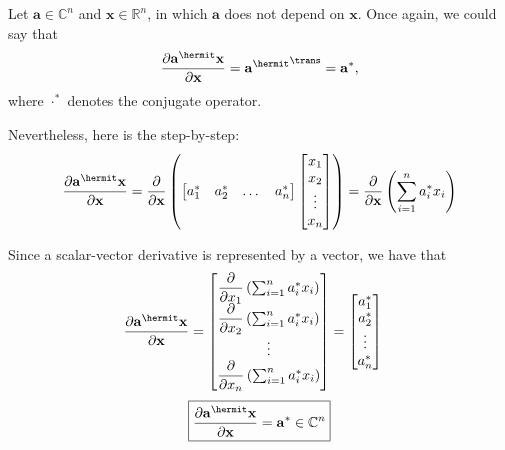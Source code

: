Let \(\mathbf{a} \in \mathbb{C}^{n}\) and \(\mathbf{x}\in \mathbb{R}^{n}\), in which \(\mathbf{a}\) does not depend on \(\mathbf{x}\). Once again, we could say that
\begin{align}
    \dfrac{\partial \mathbf{a}^\hermit \mathbf{x}}{\partial \mathbf{x}} = {\mathbf{a}^\hermit}^\trans = \mathbf{a}^*,
\end{align}
where \(\cdot^*\) denotes the conjugate operator.

Nevertheless, here is the step-by-step:
\begin{align}
    \dfrac{\partial \mathbf{a}^\hermit \mathbf{x}}{\partial \mathbf{x}} &= \dfrac{\partial}{\partial \mathbf{x}} \left(
    \begin{bmatrix}
        a^*_1 & a^*_2 & \dots & a^*_n
    \end{bmatrix} \begin{bmatrix}
        x_{1} \\ x_{2} \\ \vdots \\ x_{n}
    \end{bmatrix} \right) 
    = \dfrac{\partial}{\partial \mathbf{x}} \left( \sum_{i = 1}^n a^*_ix_i \right) \\
\end{align}

Since a scalar-vector derivative is represented by a vector, we have that
\begin{align}
    \dfrac{\partial \mathbf{a}^\hermit \mathbf{x}}{\partial \mathbf{x}} &= \begin{bmatrix}
        \dfrac{\partial}{\partial x_1} \left( \sum_{i = 1}^n a^*_ix_i \right) \\ \dfrac{\partial}{\partial x_2} \left( \sum_{i = 1}^n a^*_ix_i \right) \\ \vdots \\ \dfrac{\partial}{\partial x_n} \left( \sum_{i = 1}^n a^*_ix_i \right) 
    \end{bmatrix}
    = \begin{bmatrix}
        a^*_1 \\ a^*_2 \\ \vdots \\ a^*_n
    \end{bmatrix}
\end{align}
\begin{align}
    \boxed{\dfrac{\partial \mathbf{a}^\hermit \mathbf{x}}{\partial \mathbf{x}} = \mathbf{a}^* \in \mathbb{C}^{n}}
\end{align}

